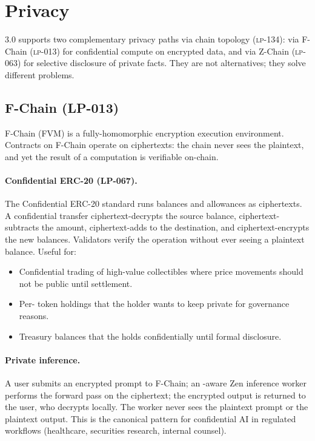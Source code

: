 \section{Privacy}
\label{sec:privacy}

\Zoo{} 3.0 supports two complementary privacy paths via \Lux{}
chain topology (\textsc{lp-134}): \FHE{} via F-Chain
(\textsc{lp-013}) for confidential compute on encrypted data, and
\ZKP{} via Z-Chain (\textsc{lp-063}) for selective disclosure of
private facts. They are not alternatives; they solve different
problems.

\subsection{F-Chain \FHE{} (LP-013)}

F-Chain (FVM) is a fully-homomorphic encryption execution
environment. Contracts on F-Chain operate on ciphertexts: the chain
never sees the plaintext, and yet the result of a computation is
verifiable on-chain.

\paragraph{Confidential ERC-20 (LP-067).}
The Confidential ERC-20 standard runs balances and allowances as
ciphertexts. A confidential transfer ciphertext-decrypts the source
balance, ciphertext-subtracts the amount, ciphertext-adds to the
destination, and ciphertext-encrypts the new balances. Validators
verify the operation without ever seeing a plaintext balance. Useful
for:

\begin{itemize}[leftmargin=1.2em]
  \item Confidential trading of high-value collectibles where price
        movements should not be public until settlement.
  \item Per-\LLM{} token holdings that the holder wants to keep
        private for governance reasons.
  \item Treasury balances that the \DAO{} holds confidentially until
        formal disclosure.
\end{itemize}

\paragraph{Private inference.}
A user submits an encrypted prompt to F-Chain; an \FHE{}-aware Zen
inference worker performs the forward pass on the ciphertext; the
encrypted output is returned to the user, who decrypts locally. The
worker never sees the plaintext prompt or the plaintext output. This
is the canonical pattern for confidential AI in regulated workflows
(healthcare, securities research, internal counsel).


